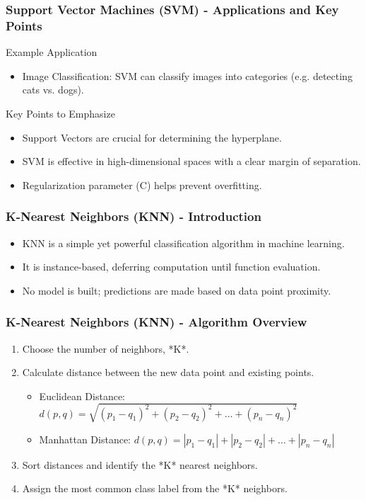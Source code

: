 \documentclass{beamer}
\begin{document}
\begin{frame}[fragile]
    \frametitle{Support Vector Machines (SVM) - Applications and Key Points}
    \begin{block}{Example Application}
        \begin{itemize}
            \item Image Classification: SVM can classify images into categories (e.g. detecting cats vs. dogs).
        \end{itemize}
    \end{block}
    
    \begin{block}{Key Points to Emphasize}
        \begin{itemize}
            \item Support Vectors are crucial for determining the hyperplane.
            \item SVM is effective in high-dimensional spaces with a clear margin of separation.
            \item Regularization parameter (C) helps prevent overfitting.
        \end{itemize}
    \end{block}
\end{frame}

\begin{frame}[fragile]
    \frametitle{K-Nearest Neighbors (KNN) - Introduction}
    \begin{itemize}
        \item KNN is a simple yet powerful classification algorithm in machine learning.
        \item It is instance-based, deferring computation until function evaluation.
        \item No model is built; predictions are made based on data point proximity.
    \end{itemize}
\end{frame}

\begin{frame}[fragile]
    \frametitle{K-Nearest Neighbors (KNN) - Algorithm Overview}
    \begin{enumerate}
        \item Choose the number of neighbors, *K*.
        \item Calculate distance between the new data point and existing points.
        \begin{itemize}
            \item Euclidean Distance: \( d(p, q) = \sqrt{(p_1 - q_1)^2 + (p_2 - q_2)^2 + \ldots + (p_n - q_n)^2} \)
            \item Manhattan Distance: \( d(p, q) = |p_1 - q_1| + |p_2 - q_2| + \ldots + |p_n - q_n| \)
        \end{itemize}
        \item Sort distances and identify the *K* nearest neighbors.
        \item Assign the most common class label from the *K* neighbors.
    \end{enumerate}
\end{frame}
\end{document}
